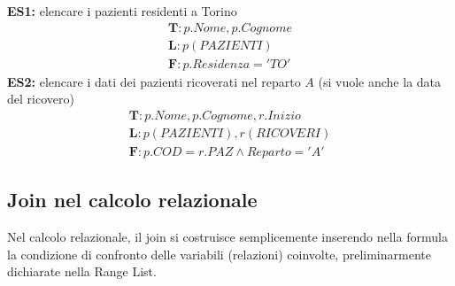 \textbf{ES1:} elencare i pazienti residenti a Torino
    \begin{equation}\begin{aligned}
        \textbf{T}: p.Nome, p.Cognome\\
        \textbf{L}: p(PAZIENTI)\\
        \textbf{F}: p.Residenza = 'TO'
    \end{aligned}\end{equation}
\textbf{ES2:} elencare i dati dei pazienti ricoverati nel reparto $A$ (si vuole anche la data del ricovero)
    \begin{equation}\begin{aligned}
        \textbf{T}: p.Nome, p.Cognome, r.Inizio\\
        \textbf{L}: p(PAZIENTI), r(RICOVERI)\\
        \textbf{F}: p.COD = r.PAZ \wedge Reparto = 'A'
    \end{aligned}\end{equation}
    
\subsection{Join nel calcolo relazionale}
Nel calcolo relazionale, il join si costruisce semplicemente inserendo nella formula la condizione di confronto delle variabili (relazioni) coinvolte, preliminarmente dichiarate nella Range List.

